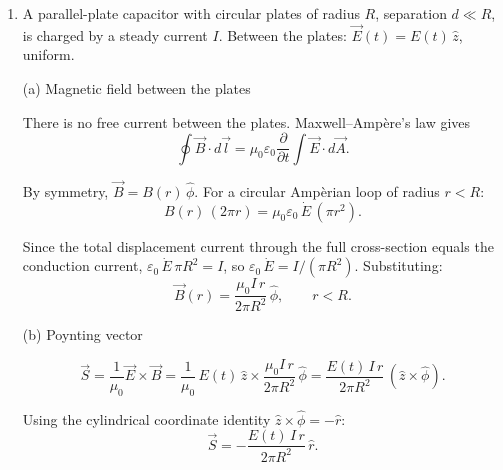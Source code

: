 \documentclass[12pt]{article}
\begin{document}
\begin{enumerate}
(c) Time-averaged Poynting vector

Since $\langle\cos^2(kz-\omega t)\rangle = \tfrac{1}{2}$:
\[
\boxed{\langle\vec{S}\rangle = \frac{E_0^2}{2\mu_0 c}\,\hat{z}.}
\]

(d) Electromagnetic energy density

\[
u = \frac{1}{2}\varepsilon_0 E^2 + \frac{1}{2\mu_0}B^2
= \frac{1}{2}\varepsilon_0 E_0^2\cos^2(kz-\omega t)
+ \frac{1}{2\mu_0}\frac{E_0^2}{c^2}\cos^2(kz-\omega t).
\]

Using $c^2 = 1/(\mu_0\varepsilon_0)$, so $1/(\mu_0 c^2)=\varepsilon_0$:
\[
u = \underbrace{\frac{1}{2}\varepsilon_0 E_0^2\cos^2(kz-\omega t)}_{u_E}
+ \underbrace{\frac{1}{2}\varepsilon_0 E_0^2\cos^2(kz-\omega t)}_{u_B}
\]
\[
\boxed{u = \varepsilon_0 E_0^2\cos^2(kz-\omega t).}
\]

We see $u_E = u_B$ term by term: \textbf{the electric and magnetic fields contribute equally to the total energy density.} The time average is $\langle u\rangle = \tfrac{1}{2}\varepsilon_0 E_0^2$.

\item A parallel-plate capacitor with circular plates of radius $R$, separation $d\ll R$, is charged by a steady current $I$. Between the plates: $\vec{E}(t)=E(t)\,\hat{z}$, uniform.

(a) Magnetic field between the plates

There is no free current between the plates. Maxwell--Amp\`ere's law gives
\[
\oint\vec{B}\cdot d\vec{l}
= \mu_0\varepsilon_0\frac{\partial}{\partial t}\int\vec{E}\cdot d\vec{A}.
\]

By symmetry, $\vec{B}=B(r)\,\hat{\phi}$. For a circular Amp\`erian loop of radius $r<R$:
\[
B(r)\,(2\pi r) = \mu_0\varepsilon_0\,\dot{E}\,(\pi r^2).
\]

Since the total displacement current through the full cross-section equals the conduction current, $\varepsilon_0\,\dot{E}\,\pi R^2 = I$, so $\varepsilon_0\,\dot{E} = I/(\pi R^2)$. Substituting:
\[
\boxed{\vec{B}(r) = \frac{\mu_0 I\, r}{2\pi R^2}\,\hat{\phi}, \qquad r < R.}
\]

(b) Poynting vector

\[
\vec{S} = \frac{1}{\mu_0}\vec{E}\times\vec{B}
= \frac{1}{\mu_0}\,E(t)\,\hat{z}\times\frac{\mu_0 I\,r}{2\pi R^2}\,\hat{\phi}
= \frac{E(t)\,I\,r}{2\pi R^2}\,(\hat{z}\times\hat{\phi}).
\]

Using the cylindrical coordinate identity $\hat{z}\times\hat{\phi}=-\hat{r}$:
\[
\boxed{\vec{S} = -\frac{E(t)\,I\,r}{2\pi R^2}\,\hat{r}.}
\]


\end{enumerate}
\end{document}
